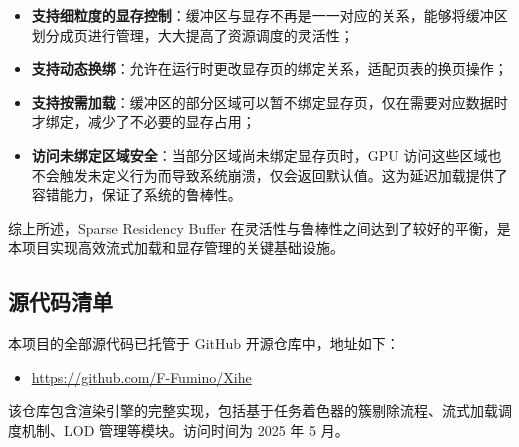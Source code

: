 {    \begin{itemize}
        \item \textbf{支持细粒度的显存控制}：缓冲区与显存不再是一一对应的关系，能够将缓冲区划分成页进行管理，大大提高了资源调度的灵活性；
        
        \item \textbf{支持动态换绑}：允许在运行时更改显存页的绑定关系，适配页表的换页操作；

        \item \textbf{支持按需加载}：缓冲区的部分区域可以暂不绑定显存页，仅在需要对应数据时才绑定，减少了不必要的显存占用；
        
        \item \textbf{访问未绑定区域安全}：当部分区域尚未绑定显存页时，GPU 访问这些区域也不会触发未定义行为而导致系统崩溃，仅会返回默认值。这为延迟加载提供了容错能力，保证了系统的鲁棒性。
    \end{itemize}

    综上所述，Sparse Residency Buffer 在灵活性与鲁棒性之间达到了较好的平衡，是本项目实现高效流式加载和显存管理的关键基础设施。

    \subsection{源代码清单}

    本项目的全部源代码已托管于 GitHub 开源仓库中，地址如下：

    \begin{itemize}
    \item \url{https://github.com/F-Fumino/Xihe}
    \end{itemize}

    该仓库包含渲染引擎的完整实现，包括基于任务着色器的簇剔除流程、流式加载调度机制、LOD 管理等模块。访问时间为 2025 年 5 月。

    \removeappendixsubsecmajornumbering
}